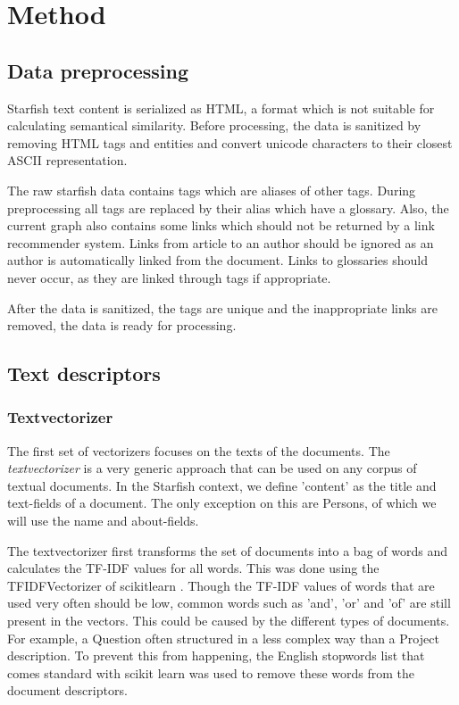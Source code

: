 \section{Method}

\subsection{Data preprocessing}
Starfish text content is serialized as HTML, a format which is not suitable for
calculating semantical similarity. Before processing, the data is sanitized by
removing HTML tags and entities and convert unicode characters to their closest
ASCII representation.

The raw starfish data contains tags which are aliases of other tags. During 
preprocessing all tags are replaced by their alias which have a glossary. Also, 
the current graph also contains some links which should not be returned by a 
link recommender system. Links from article to an author should be ignored as 
an author is automatically linked from the document. Links to glossaries should 
never occur, as they are linked through tags if appropriate.

After the data is sanitized, the tags are unique and the inappropriate links are 
removed, the data is ready for processing.

\subsection{Text descriptors}
\subsubsection{Textvectorizer}

The first set of vectorizers focuses on the texts of the documents. The
\emph{textvectorizer} is a very generic approach that can be used on any corpus
of textual documents. In the Starfish context, we define 'content' as the title
and text-fields of a document. The only exception on this are Persons, of which
we will use the name and about-fields. 

The textvectorizer first transforms the set of documents into a bag of words
and calculates the TF-IDF values for all words. This was done using the
TFIDFVectorizer of scikitlearn \citep{scikit-learn}.  Though the TF-IDF values
of words that are used very often should be low, common words such as 'and',
'or' and 'of' are still present in the vectors. This could be caused by the
different types of documents. For example, a Question often structured in a
less complex way than a Project description. To prevent this from happening,
the English stopwords list that comes standard with scikit learn was used to
remove these words from the document descriptors.

